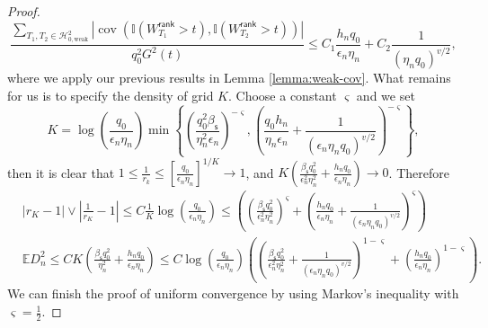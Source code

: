 \documentclass[10pt,a4paper]{amsart}
\newcommand{\E}{\mathbb{E}}
\newcommand{\abs}[1]{\left\lvert#1\right\rvert}
\newcommand{\bbI}{\mathbb{I}}
\newcommand{\cH}{\mathcal{H}}
\begin{document}
\begin{proof}
\begin{equation*}
    \frac{\sum\limits_{T_1,T_2\in\cH^2_{0,\text{weak}} } \abs{\operatorname{cov}(\bbI(W_{T_1}^{\mathsf{rank} }>t),\bbI(W_{T_2}^{\mathsf{rank} }>t)) }}{q_0^2 G^2(t)}\le C_1 \frac{h_n q_0}{\epsilon_n \eta_n }+C_2 \frac{1}{ \left(\eta_n q_0\right)^{v/2} },
\end{equation*}
 where we apply our previous results in Lemma \ref{lemma:weak-cov}. What remains for us is to specify the density of grid $K$. Choose a constant $\varsigma$ and we set
 $$K= \log(\frac{q_0 }{\epsilon_n \eta_n}) \min \left\{ \left(\frac{ q_0^2 \beta_{\mathsf{s}} }{ \eta_n^2 \epsilon_n  }\right)^{-\varsigma} , \left( \frac{q_0 h_n}{\eta_n\epsilon_n}+\frac{1}{ \left(\epsilon_n\eta_n q_0\right)^{v/2} } \right)^{-\varsigma} \right\}  ,$$ 
 then it is clear that $1\le\frac{1}{r_k}\le \left[ \frac{q_0}{\epsilon_n \eta_n} \right]^{1/K}\to 1$, and $ K (\frac{\beta_{\mathsf{s}}q_0^2 }{ \epsilon_n^2\eta_n^2} + \frac{h_n q_0}{\epsilon_n \eta_n })\to 0$. Therefore 
 \begin{equation*}
\begin{aligned}
      &\abs{r_K-1}\vee\abs{\frac{1}{r_K}-1 } \le C \frac{1}{K}\log(\frac{q_0 }{\epsilon_n \eta_n}) \le  \left( \left(\frac{\beta_{\mathsf{s}} q_0^2 }{ \epsilon_n^2\eta_n^2}\right)^{\varsigma} + \left(\frac{h_n q_0}{\epsilon_n \eta_n} +\frac{1}{ \left(\epsilon_n\eta_n q_0\right)^{v/2} }\right)^{\varsigma}\right) \\
    &\E D^2_n  \le C K \left(\frac{\beta_{\mathsf{s}}q_0^2 }{ \eta_n^2} + \frac{h_n q_0}{\epsilon_n \eta_n} \right)\le C \log(\frac{q_0 }{\epsilon_n \eta_n}) \left( \left(\frac{\beta_{\mathsf{s}} q_0^2 }{ \epsilon_n^2\eta_n^2}+\frac{1}{ \left(\epsilon_n\eta_n q_0\right)^{v/2} }\right)^{1-\varsigma} + \left(\frac{h_n q_0}{\epsilon_n \eta_n} \right)^{1-\varsigma}\right).
\end{aligned}
 \end{equation*}
We can finish the proof of uniform convergence by using Markov's inequality with $\varsigma=\frac{1}{2}$.
\end{proof}
\end{document}
